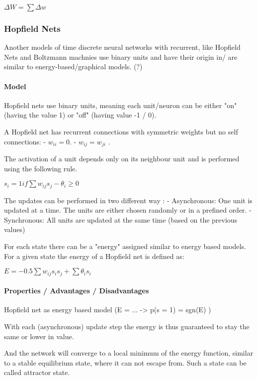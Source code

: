 $\Delta W = \sum \Delta w$


\subsubsection{Hopfield Nets}

Another models of time discrete neural networks with recurrent, like Hopfield Nets and Boltzmann machnies use binary units and have their origin in/ are similar to energy-based/graphical models. (?)   

\paragraph{Model}

Hopfield nets use binary units, meaning each unit/neuron can be either "on" (having the value 1) or "off" (having value -1 / 0). 

A Hopfield net has recurrent connections with symmetric weights but no self connections:
- $w_{ii} = 0 $.
- $w_{ij} = w_{ji}$ .

The activation of a unit depends only on its neighbour unit and is performed using the following rule.

$s_i = 1 if \sum w_{ij} s_{j} - \theta_{i} \ge 0$ 

The updates can be performed in two different way :
- Asynchronous: One unit is updated at a time. The units are either chosen randomly or in a prefined order.
- Synchronous: All units are updated at the same time (based on the previous values)

For each state there can be a "energy" assigned similar to energy based models. 
For a given state the energy of a Hopfield net is defined as:

$E = - 0.5 \sum w_{ij} s_i s_j + \sum \theta_i s_i$

\paragraph{Properties / Advantages / Disadvantages}

Hopfield net as energy based model (E = ... -> p(s = 1) = sgn(E) )

With each (asynchronous) update step the energy is thus guaranteed to stay the same or lower in value.

And the network will converge to a local minimum of the energy function, similar to a stable equilibrium state, where it can not escape from. 
Such a state can be called attractor state.

